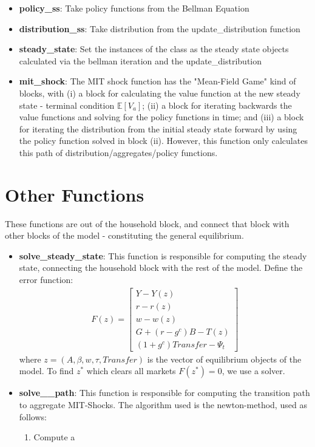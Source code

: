 \documentclass[12pt]{article} %
\theoremstyle{theorem}
\theoremstyle{definition}
\begin{document}
\begin{itemize}
\textbf{Obs:} \color{red} In the case of using this function for calculating the transition path of MIT shocks\color{black}, we use the $g_{0}$ argument in the function to start from the previous distribution in the initial period. 

\item \textbf{policy\_ss}: Take policy functions from the Bellman Equation
\item \textbf{distribution\_ss}: Take distribution from the update\_distribution function
\item \textbf{steady\_state}: Set the instances of the class as the steady state objects calculated via the bellman iteration and the update\_distribution
\item \textbf{mit\_shock}: The MIT shock function has the "Mean-Field Game" kind of blocks, with (i) a block for calculating the value function at the new steady state - terminal condition $\mathbb{E}[V_a]$; (ii) a block for iterating backwards the value functions and solving for the policy functions in time; and (iii) a block for iterating the distribution from the initial steady state forward by using the policy function solved in block (ii). However, this function only calculates this path of distribution/aggregates/policy functions.
\end{itemize}

\section*{Other Functions}

These functions are out of the household block, and connect that block with other blocks of the model - constituting the general equilibrium.

\begin{itemize}
\item \textbf{solve\_steady\_state}: This function is responsible for computing the steady state, connecting the household block with the rest of the model. Define the error function:
\begin{align*}
F(z) = \left[\begin{array}{c}
Y - Y(z) \\ 
r - r(z) \\ 
w - w(z) \\ 
G + (r-g^c)B - T(z) \\ 
(1 + g^c)Transfer - \Psi_t
\end{array} \right]
\end{align*}
where $z = (A,\beta,w,\tau,Transfer)$ is the vector of equilibrium objects of the model. To find $z^*$ which clears all markets $F(z^*) = 0$, we use a solver.

\item \textbf{solve_\transition\_path}: This function is responsible for computing the transition path to aggregate MIT-Shocks. The algorithm used is the newton-method, used as follows:
\begin{enumerate}
\item Compute a 
\end{enumerate}
\end{itemize}
\end{document}
